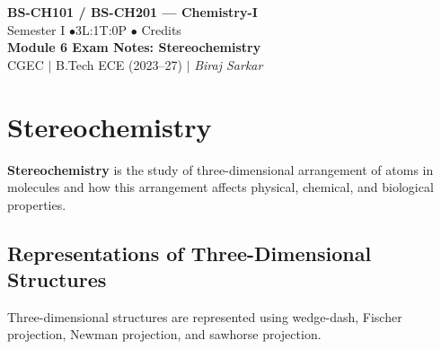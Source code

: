 \documentclass[12pt,a4paper]{article}
\begin{document}
\begin{center}
  {\LARGE\bfseries\color{myred} BS-CH101 / BS-CH201 --- Chemistry-I}\\[5pt]
  {\normalsize\color{mydark} Semester I \quad$\bullet$\quad 3L:1T:0P \quad$\bullet$ Credits}\\[3pt]
  {\normalsize\color{myteal}\textbf{Module 6 Exam Notes: Stereochemistry}}\\[3pt]
  {\small\color{mydark} CGEC \;$|$\; B.Tech ECE (2023--27) \;$|$\; \textit{Biraj Sarkar}}
\end{center}
\vspace{2pt}
\noindent{\color{myred}\rule{\linewidth}{1.5pt}}
\vspace{2pt}

\hypersetup{linkcolor=mydark}
\tableofcontents
\hypersetup{linkcolor=myteal}
\newpage
\section{Stereochemistry}

\begin{tcolorbox}[defbox]
\textbf{Stereochemistry} is the study of three-dimensional arrangement of atoms in molecules and how this arrangement affects physical, chemical, and biological properties.
\end{tcolorbox}

\subsection{Representations of Three-Dimensional Structures}
Three-dimensional structures are represented using wedge-dash, Fischer projection, Newman projection, and sawhorse projection.

\begin{tcolorbox}[tikzbox, title={Wedge-Dash Representation Around a Tetrahedral Carbon}]
\centering
{}
\end{tcolorbox}
\end{document}
